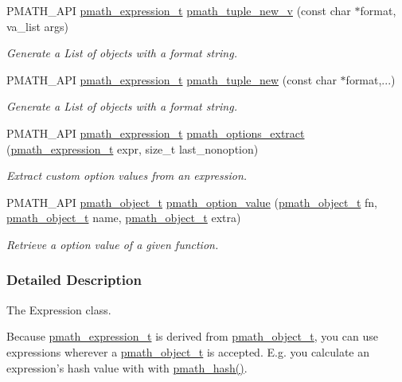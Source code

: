 \begin{CompactItemize}
PMATH\_\-API \hyperlink{classpmath__expression__t}{pmath\_\-expression\_\-t} \hyperlink{group__helpers_gc24933fbc4e7d0844dffbffa8b018e57}{pmath\_\-tuple\_\-new\_\-v} (const char $\ast$format, va\_\-list args)
\begin{CompactList}\small\item\em Generate a List of objects with a format string. \item\end{CompactList}\item 
PMATH\_\-API \hyperlink{classpmath__expression__t}{pmath\_\-expression\_\-t} \hyperlink{group__helpers_g79850326b7731d00f4e439e0b7845cdd}{pmath\_\-tuple\_\-new} (const char $\ast$format,...)
\begin{CompactList}\small\item\em Generate a List of objects with a format string. \item\end{CompactList}\item 
PMATH\_\-API \hyperlink{classpmath__expression__t}{pmath\_\-expression\_\-t} \hyperlink{group__helpers_gdb685758101df62e4a2857044be06f5d}{pmath\_\-options\_\-extract} (\hyperlink{classpmath__expression__t}{pmath\_\-expression\_\-t} expr, size\_\-t last\_\-nonoption)
\begin{CompactList}\small\item\em Extract custom option values from an expression. \item\end{CompactList}\item 
PMATH\_\-API \hyperlink{classpmath__object__t}{pmath\_\-object\_\-t} \hyperlink{group__helpers_gf9c1c133ea08ab3c0cd579b1db635f5a}{pmath\_\-option\_\-value} (\hyperlink{classpmath__object__t}{pmath\_\-object\_\-t} fn, \hyperlink{classpmath__object__t}{pmath\_\-object\_\-t} name, \hyperlink{classpmath__object__t}{pmath\_\-object\_\-t} extra)
\begin{CompactList}\small\item\em Retrieve a option value of a given function. \item\end{CompactList}\end{CompactItemize}


\subsubsection{Detailed Description}
The Expression class. 

Because \hyperlink{classpmath__expression__t}{pmath\_\-expression\_\-t} is derived from \hyperlink{classpmath__object__t}{pmath\_\-object\_\-t}, you can use expressions wherever a \hyperlink{classpmath__object__t}{pmath\_\-object\_\-t} is accepted. E.g. you calculate an expression's hash value with with \hyperlink{group__objects_g472762687d2a2b772beb00c7da677543}{pmath\_\-hash()}.

